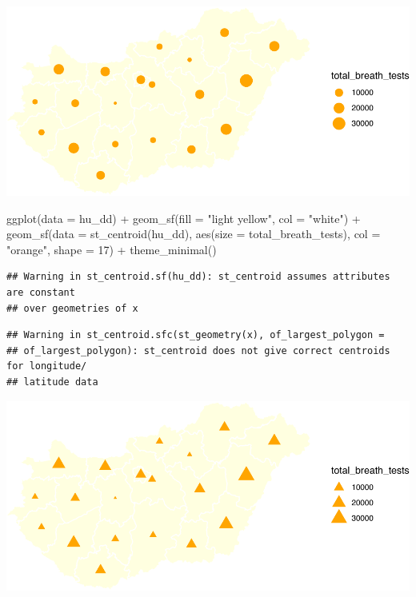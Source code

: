 \documentclass[
]{book}
\newenvironment{Shaded}{\begin{snugshade}}{\end{snugshade}}
\newcommand{\AttributeTok}[1]{\textcolor[rgb]{0.77,0.63,0.00}{#1}}
\newcommand{\DecValTok}[1]{\textcolor[rgb]{0.00,0.00,0.81}{#1}}
\newcommand{\FunctionTok}[1]{\textcolor[rgb]{0.00,0.00,0.00}{#1}}
\newcommand{\NormalTok}[1]{#1}
\newcommand{\SpecialCharTok}[1]{\textcolor[rgb]{0.00,0.00,0.00}{#1}}
\newcommand{\StringTok}[1]{\textcolor[rgb]{0.31,0.60,0.02}{#1}}
\begin{document}
\includegraphics{crime_mapping_files/figure-latex/gradsymbmapcol-1.pdf}

\begin{Shaded}
\begin{Highlighting}[]
\FunctionTok{ggplot}\NormalTok{(}\AttributeTok{data =}\NormalTok{ hu\_dd) }\SpecialCharTok{+} 
  \FunctionTok{geom\_sf}\NormalTok{(}\AttributeTok{fill =} \StringTok{"light yellow"}\NormalTok{, }\AttributeTok{col =} \StringTok{"white"}\NormalTok{) }\SpecialCharTok{+} 
  \FunctionTok{geom\_sf}\NormalTok{(}\AttributeTok{data =} \FunctionTok{st\_centroid}\NormalTok{(hu\_dd), }\FunctionTok{aes}\NormalTok{(}\AttributeTok{size =}\NormalTok{ total\_breath\_tests), }\AttributeTok{col =} \StringTok{"orange"}\NormalTok{, }\AttributeTok{shape =} \DecValTok{17}\NormalTok{) }\SpecialCharTok{+} 
  \FunctionTok{theme\_minimal}\NormalTok{()}
\end{Highlighting}
\end{Shaded}

\begin{verbatim}
## Warning in st_centroid.sf(hu_dd): st_centroid assumes attributes are constant
## over geometries of x
\end{verbatim}

\begin{verbatim}
## Warning in st_centroid.sfc(st_geometry(x), of_largest_polygon =
## of_largest_polygon): st_centroid does not give correct centroids for longitude/
## latitude data
\end{verbatim}

\includegraphics{crime_mapping_files/figure-latex/gradsymbmapcoltriangle-1.pdf}
\end{document}
